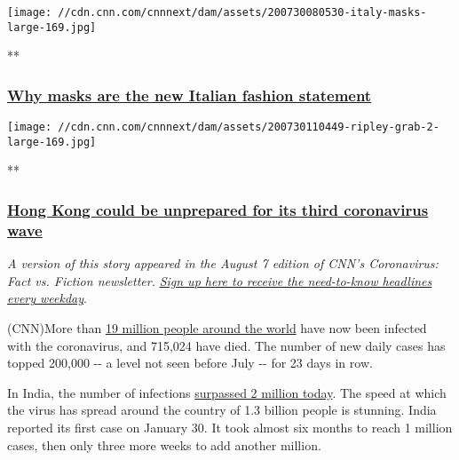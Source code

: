 \href{/videos/world/2020/07/30/italy-mask-wearing-pandemic-nadeau-pkg-vpx.cnn/video/playlists/coronavirus-intl/}{}

\texttt{[image: //cdn.cnn.com/cnnnext/dam/assets/200730080530-italy-masks-large-169.jpg]}

**

\hypertarget{why-masks-are-the-new-italian-fashion-statement}{%
\subsubsection{\texorpdfstring{\href{/videos/world/2020/07/30/italy-mask-wearing-pandemic-nadeau-pkg-vpx.cnn/video/playlists/coronavirus-intl/}{Why
masks are the new Italian fashion
statement}}{Why masks are the new Italian fashion statement}}\label{why-masks-are-the-new-italian-fashion-statement}}

\href{/videos/world/2020/07/30/hong-kong-third-wave-will-ripley-pkg-intl-ldn-vpx.cnn/video/playlists/coronavirus-intl/}{}

\texttt{[image: //cdn.cnn.com/cnnnext/dam/assets/200730110449-ripley-grab-2-large-169.jpg]}

**

\hypertarget{hong-kong-could-be-unprepared-for-its-third-coronavirus-wave}{%
\subsubsection{\texorpdfstring{\href{/videos/world/2020/07/30/hong-kong-third-wave-will-ripley-pkg-intl-ldn-vpx.cnn/video/playlists/coronavirus-intl/}{Hong
Kong could be unprepared for its third coronavirus
wave}}{Hong Kong could be unprepared for its third coronavirus wave}}\label{hong-kong-could-be-unprepared-for-its-third-coronavirus-wave}}

\emph{A version of this story appeared in the August 7 edition of CNN's
Coronavirus: Fact vs. Fiction newsletter.}
\href{https://edition.cnn.com/specials/coronavirus-newsletter}{\emph{Sign
up here to receive the need-to-know headlines every weekday}}.

(CNN)More than
\href{https://cnn.com/interactive/2020/health/coronavirus-us-maps-and-cases/}{19
million people around the world} have now been infected with the
coronavirus, and 715,024 have died. The number of new daily cases has
topped 200,000 -\/- a level not seen before July -\/- for 23 days in
row.

In India, the number of infections
\href{https://cnn.com/2020/08/07/asia/india-coronavirus-two-million-intl-hnk/index.html}{surpassed
2 million today}. The speed at which the virus has spread around the
country of 1.3 billion people is stunning. India reported its first case
on January 30. It took almost six months to reach 1 million cases, then
only three more weeks to add another million.

